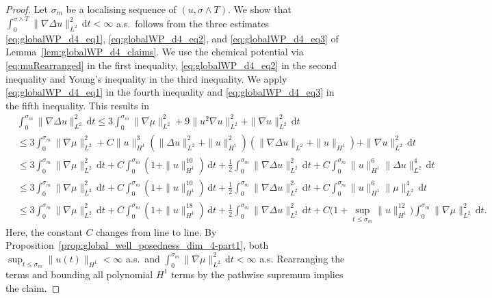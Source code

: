 \documentclass[10pt,a4paper]{amsart}
\newcommand{\dt}{\,\mathrm{d}t}
\newcommand{\grad}{\nabla}
\begin{document}
\begin{proof}
Let $\sigma_m$ be a localising sequence of $(u,\sigma\wedge T)$. We show that $\int_0^{\sigma\wedge T} \|\grad \Delta u\|^2_{L^2} \dt <\infty$ a.s.\ follows from the three estimates \eqref{eq:globalWP_d4_eq1}, \eqref{eq:globalWP_d4_eq2}, and \eqref{eq:globalWP_d4_eq3} of Lemma~\ref{lem:globalWP_d4_claims}.
We use the chemical potential via \eqref{eq:muRearranged} in the first inequality, \eqref{eq:globalWP_d4_eq2} in the second inequality and Young's inequality in the third inequality. We apply \eqref{eq:globalWP_d4_eq1} in the fourth inequality and
\eqref{eq:globalWP_d4_eq3} in the fifth inequality. This results in
\begin{align*}
    & \int_0^{\sigma_m} \|\nabla\Delta u\|_{L^2}^2\dt 
     \le 3\int_0^{\sigma_m} \|\nabla\mu\|_{L^2}^2
    + 9\|u^2\nabla u\|_{L^2}^2
    + \|\nabla u\|_{L^2}^2\dt  \\
    & \le 
    3\int_0^{\sigma_m}
    \|\nabla\mu\|_{L^2}^2
    +
    C\|u\|^3_{H^1}
    \left(\|\Delta u\|_{L^2}^2
    +\|u\|^2_{H^1}  \right)
    \left( \|\grad \Delta u\|_{L^2} +\|u\|_{H^1}\right)+
    \|\nabla u\|_{L^2}^2\dt\\
    & \le  
    3\int_0^{\sigma_m}
    \|\nabla\mu\|_{L^2}^2 \dt +
    C\int_0^{\sigma_m}(1+\|u\|_{H^1}^{10})\dt
    +
    \frac12
    \int_0^{\sigma_m}
    \|\nabla\Delta u\|_{L^2}^2\dt
    +
    C\int_0^{\sigma_m}
    \|u\|_{H^1}^6
    \|\Delta u\|_{L^2}^4\dt  \\
    & \le
    3\int_0^{\sigma_m}
    \|\nabla\mu\|_{L^2}^2 \dt +
    C\int_0^{\sigma_m}(1+\|u\|_{H^1}^{10})\dt
    +
    \frac12
    \int_0^{\sigma_m}
    \|\nabla\Delta u\|_{L^2}^2\dt
    +
    C\int_0^{\sigma_m}
    \|u\|_{H^1}^6
    \|\mu\|_{L^2}^4\dt \\
    & \le
    3\int_0^{\sigma_m}
    \|\nabla\mu\|_{L^2}^2 \dt +
    C\int_0^{\sigma_m}(1+\|u\|_{H^1}^{18})\dt
    +
    \frac12
    \int_0^{\sigma_m}
    \|\nabla\Delta u\|_{L^2}^2\dt
     + C\Big(1+ \sup_{t\leq \sigma_m} \|u\|^{12}_{H^1} \Big)
    \int_0^{\sigma_m}
    \|\nabla\mu\|_{L^2}^2\dt.
 \end{align*}
Here, the constant $C$ changes from line to line. By Proposition~\ref{prop:global_well_posedness_dim_4-part1}, both $\sup_{t\le \sigma_m} \|u(t)\|_{H^1}<\infty$ a.s.\ and $\int_0^{\sigma_m} \|\grad \mu\|_{L^2}^2\dt<\infty$ a.s. Rearranging the terms and bounding all polynomial $H^1$ terms by the pathwise supremum implies the claim.
\end{proof}
\end{document}
